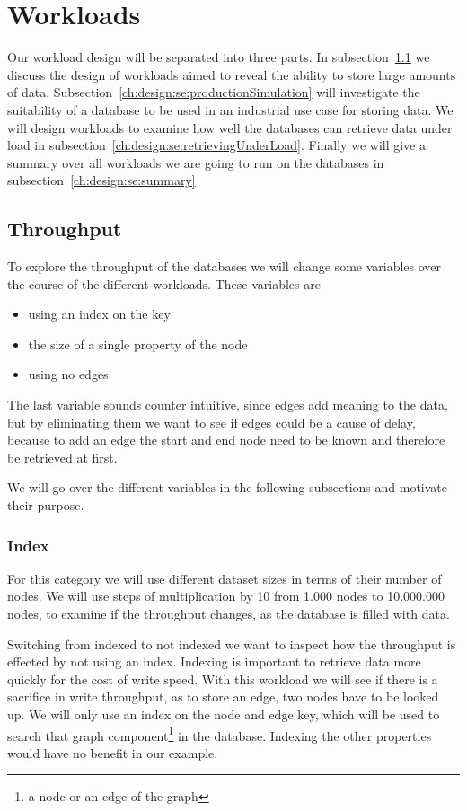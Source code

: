\section{Workloads}
\label{ch:design:se:workloads}
Our workload design will be separated into three parts.
In subsection~\ref{ch:design:se:throughput} we discuss the design of workloads aimed to reveal the ability to store large amounts of data.
Subsection~\ref{ch:design:se:productionSimulation} will investigate the suitability of a database to be used in an industrial use case for storing data.
We will design workloads to examine how well the databases can retrieve data under load in subsection~\ref{ch:design:se:retrievingUnderLoad}.
Finally we will give a summary over all workloads we are going to run on the databases in subsection~\ref{ch:design:se:summary}

\subsection{Throughput}
\label{ch:design:se:throughput}
To explore the throughput of the databases we will change some variables over the course of the different workloads.
These variables are

\begin{itemize}
  \item using an index on the key
  \item the size of a single property of the node
  \item using no edges.
\end{itemize}

The last variable sounds counter intuitive,
since edges add meaning to the data,
but by eliminating them we want to see if edges could be a cause of delay,
because to add an edge the start and end node need to be known and therefore be retrieved at first.

We will go over the different variables in the following subsections and motivate their purpose.

\subsubsection{Index}
\label{ch:design:se:index}
For this category we will use different dataset sizes in terms of their number of nodes.
We will use steps of multiplication by 10 from 1.000 nodes to 10.000.000 nodes,
to examine if the throughput changes,
as the database is filled with data.

Switching from indexed to not indexed we want to inspect how the throughput is effected by not using an index.
Indexing is important to retrieve data more quickly for the cost of write speed.
With this workload we will see if there is a sacrifice in write throughput,
as to store an edge,
two nodes have to be looked up.
We will only use an index on the node and edge key,
which will be used to search that graph component\footnote{a node or an edge of the graph} in the database.
Indexing the other properties would have no benefit in our example.

